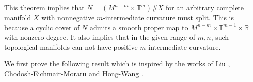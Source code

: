 \documentclass[11pt,letterpaper]{amsart}
\theoremstyle{definition}
\theoremstyle{remark}
\numberwithin{equation}{section}
\begin{document}
This theorem implies that $N=(M^{n-m}\times \mathbb{T}^m)\# X$ for an arbitrary complete manifold $X$ with nonnegative $m$-intermediate curvature must split. This is because a cyclic cover of $N$ admits a smooth proper map to $M^{n-m}\times \mathbb{T}^{m-1}\times \mathbb{R}$ with nonzero degree. It also implies that in the given range of $m,n$, such topological manifolds can not have positive $m$-intermediate curvature.

 We first prove the following result which is inspired by the works of Liu \cite{Liu-nonnegative-Ricci-curvature}, Chodosh-Eichmair-Moraru \cite{chodoshsplittingtheorem} and Hong-Wang \cite{hong-wang-splitting}.

 
\end{document}
